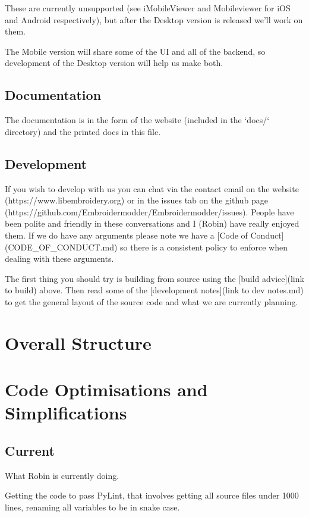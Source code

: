 \documentclass[10pt]{report}
\begin{document}
These are currently unsupported (see iMobileViewer and Mobileviewer for
iOS and Android respectively), but after the Desktop version is
released we'll work on them.

The Mobile version will share some of the UI and all of the backend,
so development of the Desktop version will help us make both.

\subsection{Documentation}

The documentation is in the form of the website (included in the `docs/`
directory) and the printed docs in this file.

\subsection{Development}

If you wish to develop with us you can chat via the contact email
on the website (https://www.libembroidery.org) or in the issues tab on the
github page (https://github.com/Embroidermodder/Embroidermodder/issues).
People have been polite and friendly in these conversations and I (Robin)
have really enjoyed them.
If we do have any arguments please note we have a
[Code of Conduct](CODE\_OF\_CONDUCT.md) so there is a consistent policy to
enforce when dealing with these arguments.

The first thing you should try is building from source using the [build advice](link to build)
above. Then read some of the [development notes](link to dev notes.md) to get the general
layout of the source code and what we are currently planning.


\section{Overall Structure}

\section{Code Optimisations and Simplifications}

\subsection{Current}

What Robin is currently doing.

Getting the code to pass PyLint, that involves getting all source files
under 1000 lines, renaming all variables to be in snake case.
\end{document}

